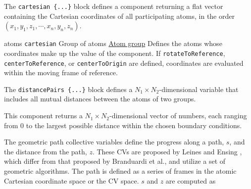 

The \texttt{cartesian~\{...\}} block defines a component returning a flat vector containing
the Cartesian coordinates of all participating atoms, in the order
$(x_1, y_1, z_1, \cdots, x_n, y_n, z_n)$.

\begin{cvcoptions}
\item %
  \key
    {atoms}{%
    \texttt{cartesian}}{%
    Group of atoms}{%
    \hyperref[sec:colvar_atom_groups]{Atom group}}{%
    Defines the atoms whose coordinates make up the value of the component.
    If \texttt{rotateToReference}, \texttt{centerToReference}, or \texttt{centerToOrigin} are defined, coordinates
    are evaluated within the moving frame of reference.}
\end{cvcoptions}



The \texttt{distancePairs~\{...\}} block defines a $N_{\mathrm{1}}\times{}N_{\mathrm{2}}$-dimensional variable that includes all mutual distances between the atoms of two groups.
\ifdefined{}\fi

\begin{cvcoptions}
\item %
\item %
\end{cvcoptions}
This component returns a $N_{\mathrm{1}}\times{}N_{\mathrm{2}}$-dimensional vector of numbers, each ranging from $0$ to the largest possible distance within the chosen boundary conditions.



The geometric path collective variables define the progress along a path, $s$, and the distance from the path, $z$. These CVs are proposed by Leines and Ensing\cite{Leines2012} , which differ from that\cite{Branduardi2007} proposed by Branduardi et al., and utilize a set of geometric algorithms. The path is defined as a series of frames in the atomic Cartesian coordinate space or the CV space. $s$ and $z$ are computed as

